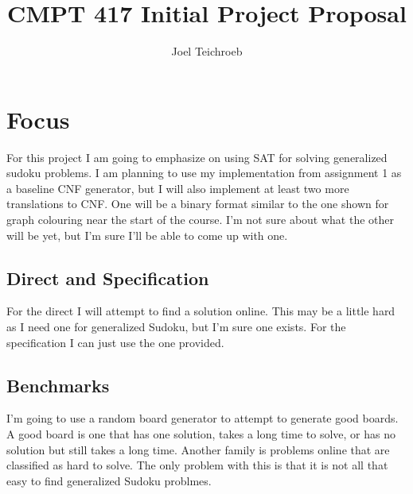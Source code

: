 \documentclass[11pt]{article} %
\title{CMPT 417 Initial Project Proposal}
\author{Joel Teichroeb}
\begin{document}
\maketitle

\section{Focus}

For this project I am going to emphasize on using SAT for solving generalized sudoku problems. I am planning to use my implementation from assignment 1 as a baseline CNF generator, but I will also implement at least two more translations to CNF. One will be a binary format similar to the one shown for graph colouring near the start of the course. I'm not sure about what the other will be yet, but I'm sure I'll be able to come up with one.

\subsection{Direct and Specification}
For the direct I will attempt to find a solution online. This may be a little hard as I need one for generalized Sudoku, but I'm sure one exists. For the specification I can just use the one provided.

\subsection{Benchmarks}

I'm going to use a random board generator to attempt to generate good boards. A good board is one that has one solution, takes a long time to solve, or has no solution but still takes a long time.
Another family is problems online that are classified as hard to solve. The only problem with this is that it is not all that easy to find generalized Sudoku problmes.
\end{document}
